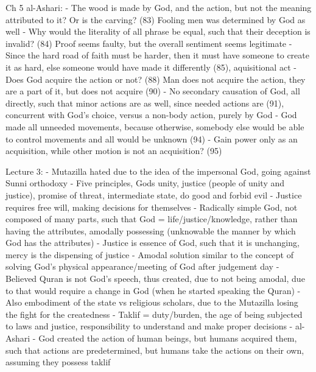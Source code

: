 \documentclass[11 pt, twoside]{article}
\begin{document}
Ch 5 al-Ashari:
- The wood is made by God, and the action, but not the meaning attributed to it? Or is the carving? (83) Fooling men was determined by God as well
	- Why would the literality of all phrase be equal, such that their deception is invalid? (84) Proof seems faulty, but the overall sentiment seems legitimate
- Since the hard road of faith must be harder, then it must have someone to create it as hard, else someone would have made it differently (85), aquisitional act
- Does God acquire the action or not? (88) Man does not acquire the action, they are a part of it, but does not acquire (90)
- No secondary causation of God, all directly, such that minor actions are as well, since needed actions are (91), concurrent with God's choice, versus a non-body action, purely by God
- God made all unneeded movements, because otherwise, somebody else would be able to control movements and all would be unknown (94)
	- Gain power only as an acquisition, while other motion is not an acquisition? (95)

Lecture 3:
- Mutazilla hated due to the idea of the impersonal God, going against Sunni orthodoxy
	- Five principles, Gods unity, justice (people of unity and justice), promise of threat, intermediate state, do good and forbid evil 
		- Justice requires free will, making decisions for themselves
	- Radically simple God, not composed of many parts, such that God = life/justice/knowledge, rather than having the attributes, amodally possessing (unknowable the manner by which God has the attributes)
		- Justice is essence of God, such that it is unchanging, mercy is the dispensing of justice
		- Amodal solution similar to the concept of solving God's physical appearance/meeting of God after judgement day
	- Believed Quran is not God's speech, thus created, due to not being amodal, due to that would require a change in God (when he started speaking the Quran)
	- Also embodiment of the state vs religious scholars, due to the Mutazilla losing the fight for the createdness
- Taklif = duty/burden, the age of being subjected to laws and justice, responsibility to understand and make proper decisions
- al-Ashari - God created the action of human beings, but humans acquired them, such that actions are predetermined, but humans take the actions on their own, assuming they possess taklif
\end{document}
